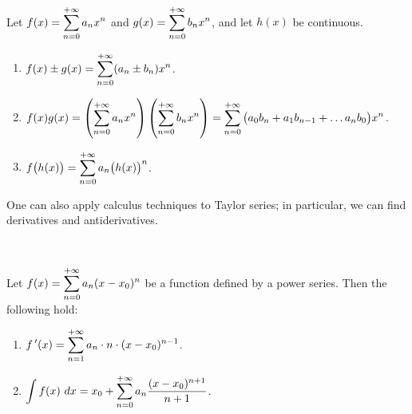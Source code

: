 \begin{theorem}\label{thm:series_alg}
{\footnotesize $\,$\\}
Let $\displaystyle f(x) = \sum_{n=0}^{+\infty} a_nx^n$ and $\displaystyle g(x) = \sum_{n=0}^{+\infty} b_nx^n$, and let $h(x)$ be continuous.

\begin{enumerate}
	\item $\displaystyle f(x)\pm g(x) = \sum_{n=0}^{+\infty} (a_n\pm b_n)x^n$.
	\item	$\displaystyle 	f(x)g(x) = \left(\sum_{n=0}^{+\infty} a_nx^n\right)\left(\sum_{n=0}^{+\infty} b_nx^n\right) = \sum_{n=0}^{+\infty}\big(a_0b_n+a_1b_{n-1}+\ldots a_nb_0\big)x^n$.
	
	\item $\displaystyle f\big(h(x)\big) = \sum_{n=0}^{+\infty} a_n\big(h(x)\big)^n$.

\end{enumerate}
\end{theorem}

One can also apply calculus techniques to Taylor series; in particular, we can find derivatives and antiderivatives. 


\begin{theorem}\label{thm:calc_power_series}
{\footnotesize $\,$}\vspace*{-0.75cm}

Let $\displaystyle f(x) = \sum_{n=0}^{+\infty} a_n(x-x_0)^n$ be a function defined by a power series. Then the following hold: 
	\begin{enumerate}
		\item	$\displaystyle f\,'(x) = \sum_{n=1}^{+\infty} a_n\cdot n\cdot (x-x_0)^{n-1}$.
		\item	$\displaystyle \int f(x)\ dx = x_0+\sum_{n=0}^{+\infty} a_n\frac{(x-x_0)^{n+1}}{n+1}$.
	\end{enumerate}
\end{theorem}

